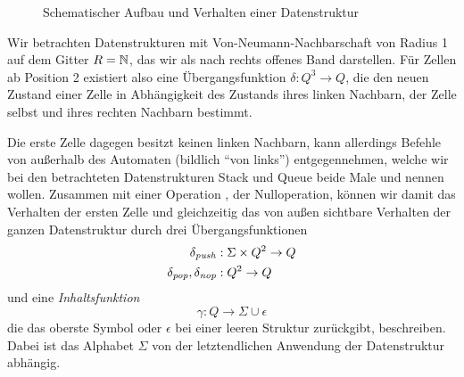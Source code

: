 \documentclass{article}
\begin{document}
\begin{figure}[h]
    \centering
    \caption{Schematischer Aufbau und Verhalten einer Datenstruktur}
\end{figure}
Wir betrachten Datenstrukturen mit Von-Neumann-Nachbarschaft von Radius 1 auf dem Gitter $R = \mathbb{N}$, das wir als nach rechts offenes Band darstellen. Für Zellen ab Position 2 existiert also eine Übergangsfunktion $\delta : Q^3 \rightarrow Q$, die den neuen Zustand einer Zelle in Abhängigkeit des Zustands ihres linken Nachbarn, der Zelle selbst und ihres rechten Nachbarn bestimmt.

Die erste Zelle dagegen besitzt keinen linken Nachbarn, kann allerdings Befehle von außerhalb des Automaten (bildlich "`von links"') entgegennehmen, welche wir bei den betrachteten Datenstrukturen Stack und Queue beide Male \push und \pop nennen wollen. Zusammen mit einer Operation \nop, der Nulloperation, können wir damit das Verhalten der ersten Zelle und gleichzeitig das von außen sichtbare Verhalten der ganzen Datenstruktur durch drei Übergangsfunktionen
\begin{align*}
    \delta_{\mathit{push}} &: \Sigma \times Q^2 \rightarrow Q \\
    \delta_{\mathit{pop}}, \delta_{\mathit{nop}} &: Q^2 \rightarrow Q
\end{align*}
und eine \emph{Inhaltsfunktion}
\[ \gamma : Q \rightarrow \Sigma \cup {\epsilon} \]
die das oberste Symbol oder $\epsilon$ bei einer leeren Struktur zurückgibt, beschreiben. Dabei ist das Alphabet $\Sigma$ von der letztendlichen Anwendung der Datenstruktur abhängig.
\end{document}
